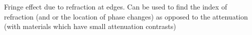 Fringe effect due to refraction at edges. Can be used to find the index of refraction (and or the location of phase changes) as opposed to the attenuation (with materials which have small attenuation contrasts)






